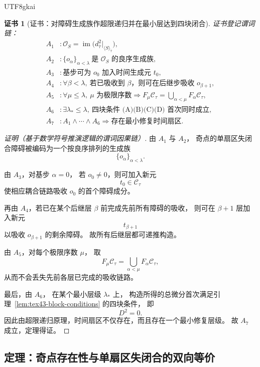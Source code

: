 \documentclass[12pt]{article}
\newtheorem{Certificate}{证书}[section]
\begin{document}
\begin{CJK*}{UTF8}{gkai}
\begin{Certificate}[证书：对障碍生成族作超限递归并在最小层达到四块闭合]
\label{cert:tex43-time-sector-transfinite}
证书登记谓词链：
\[
\begin{aligned}
  A_1 &: \mathcal O_S=\operatorname{im}\big(d_{\bar\tau}^2|_{\langle S\rangle_{\bar\tau}}\big),\\
  A_2 &: \{o_\alpha\}_{\alpha<\lambda}\ \text{是 }\mathcal O_S\text{ 的良序生成族},\\
  A_3 &: \text{基步可为 }o_0\text{ 加入时间生成元 }t_0,\\
  A_4 &: \forall \beta<\lambda,\ \text{若已吸收到 }\beta\text{，则可在后继步吸收 }o_{\beta+1},\\
  A_5 &: \forall \mu\le\lambda,\ \mu\text{ 为极限序数}\Rightarrow
         F_\mu\mathcal C_\tau=\bigcup_{\alpha<\mu}F_\alpha\mathcal C_\tau,\\
  A_6 &: \exists \lambda_\ast\le\lambda,\ \text{四块条件 (A)(B)(C)(D) 首次同时成立},\\
  A_7 &: A_1\wedge\cdots\wedge A_6 \Rightarrow
         \text{存在最小修复时间扇区}.
\end{aligned}
\]
\end{Certificate}

\begin{proof}[证明（基于数学符号推演逻辑的谓词因果链）]
由 $A_1$ 与 $A_2$，
奇点的单扇区失闭合障碍被编码为一个按良序排列的生成族
\[
  \{o_\alpha\}_{\alpha<\lambda}.
\]

由 $A_3$，对基步 $\alpha=0$，
若 $o_0\neq 0$，则可加入新元
\[
  t_0\in \mathcal C_\tau
\]
使相应耦合链路吸收 $o_0$ 的首个障碍成分。

再由 $A_4$，若已在某个后继层 $\beta$ 前完成先前所有障碍的吸收，
则可在 $\beta+1$ 层加入新元
\[
  t_{\beta+1}
\]
以吸收 $o_{\beta+1}$ 的剩余障碍。
故所有后继层都可递推构造。

由 $A_5$，对每个极限序数 $\mu$，
取
\[
  F_\mu\mathcal C_\tau=\bigcup_{\alpha<\mu}F_\alpha\mathcal C_\tau,
\]
从而不会丢失先前各层已完成的吸收链路。

最后，由 $A_6$，
在某个最小层级 $\lambda_\ast$ 上，
构造所得的总微分首次满足引理~\ref{lem:tex43-block-conditions} 的四块条件，
即
\[
  D^2=0.
\]
因此由超限递归原理，时间扇区不仅存在，而且存在一个最小修复层级。
故 $A_7$ 成立，定理得证。
\end{proof}

\subsection{定理：奇点存在性与单扇区失闭合的双向等价}
\label{subsec:tex43-ch8-theorem-existence}


\end{CJK*}
\end{document}
